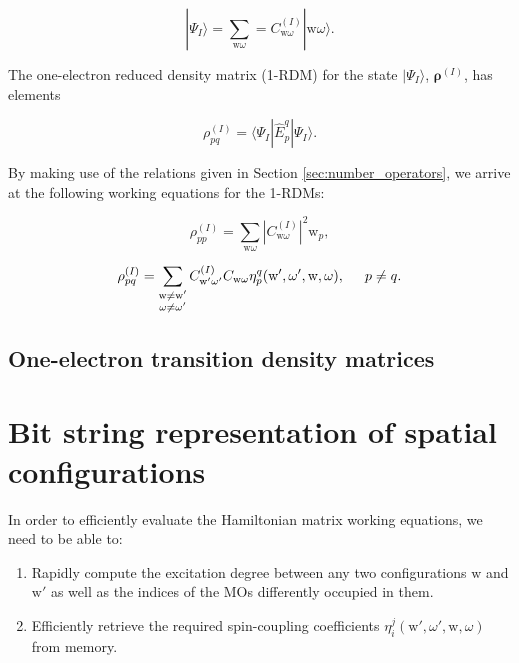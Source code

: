 \documentclass[12pt,a4paper]{report}
\begin{document}
\begin{equation}
  | \Psi_{I} \rangle = \sum_{\text{w}\omega} =
  C_{\text{w}\omega}^{(I)} | \text{w} \omega \rangle.
\end{equation}

The one-electron reduced density matrix (1-RDM) for the state $|
\Psi_{I} \rangle$, $\boldsymbol{\rho}^{(I)}$, has elements

\begin{equation}
  \rho_{pq}^{(I)} = \langle \Psi_{I} | \hat{E}_{p}^{q} | \Psi_{I}
  \rangle.
\end{equation}

By making use of the relations given in Section
\ref{sec:number_operators}, we arrive at the following working
equations for the 1-RDMs:

\begin{equation}
  \rho_{pp}^{(I)} = \sum_{\text{w}\omega} \left|
  C_{\text{w}\omega}^{(I)} \right|^{2} \text{w}_{p},
\end{equation}

\begin{equation}
  \rho_{pq}^{(I)} = \sum_{\substack{\text{w}\ne\text{w}'
      \\ \omega\ne\omega'}} C_{\text{w}'\omega'}^{(I)}
  C_{\text{w}\omega}
  \eta_{p}^{q}(\text{w}',\omega',\text{w},\omega), \hspace{0.5cm}
  p \ne q.
\end{equation}

\section{One-electron transition density matrices}

\chapter{Bit string representation of spatial configurations}
In order to efficiently evaluate the Hamiltonian matrix working
equations, we need to be able to:

\begin{enumerate}
\item Rapidly compute the excitation degree between any two
  configurations $\text{w}$ and $\text{w}'$ as well as the indices of
  the MOs differently occupied in them.
\item Efficiently retrieve the required spin-coupling coefficients
  $\eta_{i}^{j}(\text{w}',\omega',\text{w},\omega)$ from memory.
\end{enumerate}
\end{document}
